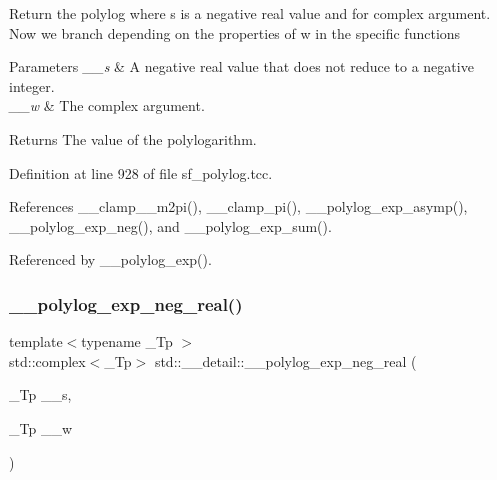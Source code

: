 Return the polylog where s is a negative real value and for complex argument. Now we branch depending on the properties of w in the specific functions


\begin{DoxyParams}{Parameters}
{\em \+\_\+\+\_\+s} & A negative real value that does not reduce to a negative integer. \\
\hline
{\em \+\_\+\+\_\+w} & The complex argument. \\
\hline
\end{DoxyParams}
\begin{DoxyReturn}{Returns}
The value of the polylogarithm. 
\end{DoxyReturn}


Definition at line 928 of file sf\+\_\+polylog.\+tcc.



References \+\_\+\+\_\+clamp\+\_\+\_\+m2pi(), \+\_\+\+\_\+clamp\+\_\+pi(), \+\_\+\+\_\+polylog\+\_\+exp\+\_\+asymp(), \+\_\+\+\_\+polylog\+\_\+exp\+\_\+neg(), and \+\_\+\+\_\+polylog\+\_\+exp\+\_\+sum().



Referenced by \+\_\+\+\_\+polylog\+\_\+exp().

\mbox{\label{namespacestd_1_1____detail_a65df07847bbb3c92518449fbc5787870}} 
\subsubsection{\texorpdfstring{\+\_\+\+\_\+polylog\+\_\+exp\+\_\+neg\+\_\+real()}{\_\_polylog\_exp\_neg\_real()}\hspace{0.1cm}{\footnotesize\ttfamily [2/2]}}
{\footnotesize\ttfamily template$<$typename \+\_\+\+Tp $>$ \\
std\+::complex$<$\+\_\+\+Tp$>$ std\+::\+\_\+\+\_\+detail\+::\+\_\+\+\_\+polylog\+\_\+exp\+\_\+neg\+\_\+real (\begin{DoxyParamCaption}\item[{\+\_\+\+Tp}]{\+\_\+\+\_\+s,  }\item[{\+\_\+\+Tp}]{\+\_\+\+\_\+w }\end{DoxyParamCaption})}

